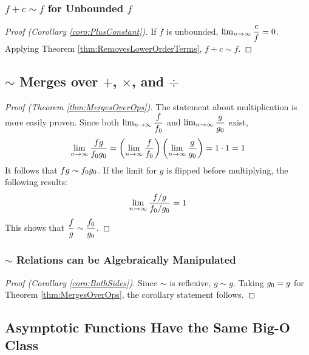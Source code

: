 \subsubsection{$f + c \sim f$ for Unbounded $f$}

\begin{proof}[Proof (Corollary \ref{coro:PlusConstant})]
	If $f$ is unbounded, $\lim_{n \to \infty} \dfrac{c}{f} = 0$. Applying Theorem \ref{thm:RemovesLowerOrderTerms}, $f + c \sim f$.
\end{proof}

\subsection{$\sim$ Merges over $+$, $\times$, and $\div$}

\begin{proof}[Proof (Theorem \ref{thm:MergesOverOps})]
	
	The statement about multiplication is more easily proven. Since both $\lim_{n \to \infty} \dfrac{f}{f_0}$ and $\lim_{n \to \infty} \dfrac{g}{g_0}$ exist,
	\begin{align*}
	\lim_{n \to \infty} \frac{fg}{f_0g_0} = \left( \lim_{n \to \infty} \frac{f}{f_0} \right) \left( \lim_{n \to \infty} \frac{g}{g_0} \right) = 1 \cdot 1 = 1
	\end{align*}
	It follows that $fg \sim f_0g_0$. If the limit for $g$ is flipped before multiplying, the following results:
	\begin{align*}
	\lim_{n \to \infty} \frac{f / g}{f_0 / g_0} = 1
	\end{align*}
	This shows that $\dfrac f g \sim \dfrac {f_0} {g_0}$.
\end{proof}

\subsubsection{$\sim$ Relations can be Algebraically Manipulated}

\begin{proof}[Proof (Corollary \ref{coro:BothSides})]
	Since $\sim$ is reflexive, $g \sim g$. Taking $g_0 = g$ for Theorem \ref{thm:MergesOverOps}, the corollary statement follows.
\end{proof}

\subsection{Asymptotic Functions Have the Same Big-O Class}

